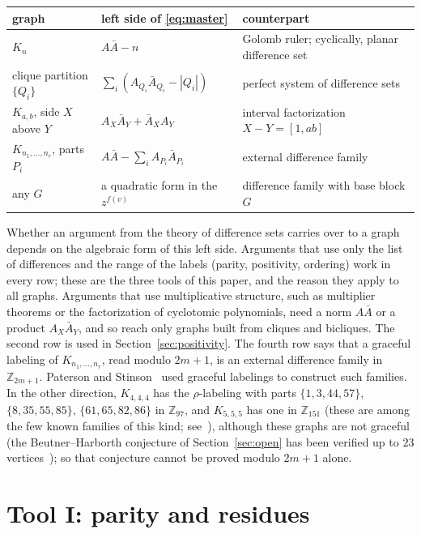 \documentclass[11pt]{amsart}
\theoremstyle{tplain}
\theoremstyle{tdefinition}
\theoremstyle{tremark}
\newcommand{\ZZ}{\mathbb Z}
\begin{document}
\begin{center}\footnotesize
\begin{tabular}{@{}lll@{}}
\toprule
\textbf{graph} & \textbf{left side of \eqref{eq:master}} & \textbf{counterpart}\\
\midrule
$K_n$ & $A\bar A-n$ & Golomb ruler; cyclically, planar difference set~\cite{bjl}\\
clique partition $\{Q_i\}$ & $\sum_i(A_{Q_i}\bar A_{Q_i}-|Q_i|)$ & perfect system of difference sets~\cite{abrham,bkt}\\
$K_{a,b}$, side $X$ above $Y$ & $A_X\bar A_Y+\bar A_XA_Y$ & interval factorization $X-Y=[1,ab]$~\cite{debruijn}\\
$K_{n_1,\dots,n_r}$, parts $P_i$ & $A\bar A-\sum_iA_{P_i}\bar A_{P_i}$ & external difference family~\cite{ps}\\
any $G$ & a quadratic form in the $z^{f(v)}$ & difference family with base block $G$~\cite{rosa}\\
\bottomrule
\end{tabular}
\end{center}

\medskip
\noindent Whether an argument from the theory of difference sets carries over
to a graph depends on the algebraic form of this left side. Arguments that use only
the list of differences and the range of the labels (parity, positivity,
ordering) work in every row; these are the three tools of this paper, and the
reason they apply to all graphs. Arguments that use multiplicative structure, such as multiplier
theorems or the factorization of cyclotomic polynomials, need a norm $A\bar A$
or a product $A_X\bar A_Y$, and so reach only graphs built from cliques and
bicliques. The second row is used in Section~\ref{sec:positivity}. The fourth row says that a graceful labeling of
$K_{n_1,\dots,n_r}$, read modulo $2m+1$, is an external difference family
in~$\ZZ_{2m+1}$. Paterson and Stinson~\cite{ps} used graceful labelings to
construct such families. In the other direction, $K_{4,4,4}$ has the
$\rho$-labeling with parts $\{1,3,44,57\}$, $\{8,35,55,85\}$,
$\{61,65,82,86\}$ in $\ZZ_{97}$, and $K_{5,5,5}$ has one in $\ZZ_{151}$ (these
are among the few known families of this kind; see~\cite{bmt}), although
these graphs are not graceful (the Beutner--Harborth conjecture of Section~\ref{sec:open} has
been verified up to $23$ vertices~\cite{gallian}); so that conjecture cannot
be proved modulo $2m+1$ alone.

\section{Tool I: parity and residues}\label{sec:parity}
\end{document}
